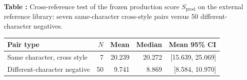 \begin{center}
\noindent\textbf{Table \thetable:} Cross-reference test of the frozen
production score \(S_{\mathrm{prod}}\) on the external reference library:
seven same-character cross-style pairs versus 50 different-character
negatives.\par
\label{tab:cross-reference}
\vspace{0.5em}
\begin{tabular}{lrrrr}
\toprule
Pair type & $N$ & Mean & Median & Mean 95\% CI \\
\midrule
Same character, cross style & 7 & 20.239 & 20.272 & [15.639, 25.069] \\
Different-character negative & 50 & 9.741 & 8.869 & [8.584, 10.970] \\
\bottomrule
\end{tabular}
\end{center}
